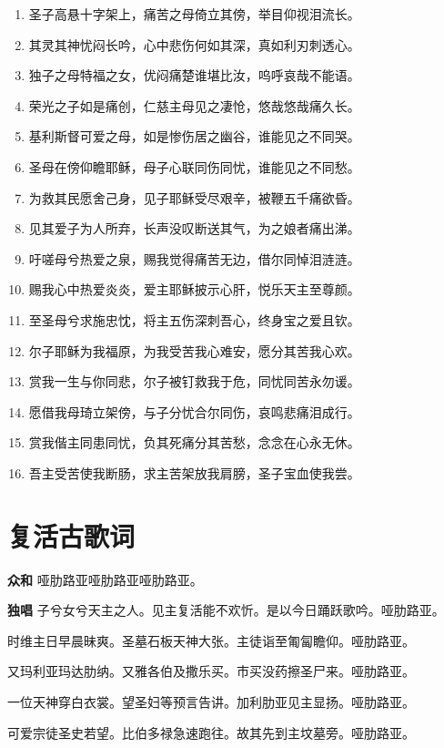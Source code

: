 \documentclass[UTF8,17pt]{ctexart}
\begin{document}
\begin{enumerate}
    \item 圣⼦⾼悬⼗字架上，痛苦之母倚⽴其傍，举⽬仰视泪流长。
    \item 其灵其神忧闷长吟，⼼中悲伤何如其深，真如利刃刺透⼼。
    \item 独⼦之母特福之⼥，优闷痛楚谁堪⽐汝，呜呼哀哉不能语。
    \item 荣光之⼦如是痛创，仁慈主母见之凄怆，悠哉悠哉痛久长。
    \item 基利斯督可爱之母，如是惨伤居之幽⾕，谁能见之不同哭。
    \item 圣母在傍仰瞻耶稣，母⼦⼼联同伤同忧，谁能见之不同愁。
    \item 为救其民愿舍⼰⾝，见⼦耶稣受尽艰⾟，被鞭五千痛欲昏。
    \item 见其爱⼦为⼈所弃，长声没叹断送其⽓，为之娘者痛出涕。
    \item 吁嗟母兮热爱之泉，赐我觉得痛苦⽆边，借尔同悼泪涟涟。
    \item 赐我⼼中热爱炎炎，爱主耶稣披⽰⼼肝，悦乐天主⾄尊颜。
    \item ⾄圣母兮求施忠忱，将主五伤深刺吾⼼，终⾝宝之爱且钦。
    \item 尔⼦耶稣为我福原，为我受苦我⼼难安，愿分其苦我⼼欢。
    \item 赏我⼀⽣与你同悲，尔⼦被钉救我于危，同忧同苦永勿谖。
    \item 愿借我母琦⽴架傍，与⼦分忧合尔同伤，哀鸣悲痛泪成⾏。
    \item 赏我偕主同患同忧，负其死痛分其苦愁，念念在⼼永⽆休。
    \item 吾主受苦使我断肠，求主苦架放我肩膀，圣⼦宝⾎使我尝。
\end{enumerate}

\section{复活古歌词}

\textbf{众和} \quad 哑肋路亚哑肋路亚哑肋路亚。

\textbf{独唱} \quad ⼦兮⼥兮天主之⼈。见主复活能不欢忻。是以今⽇踊跃歌吟。哑肋路亚。

时维主⽇早晨昧爽。圣墓⽯板天神⼤张。主徒诣⾄匍匐瞻仰。哑肋路亚。

又玛利亚玛达肋纳。又雅各伯及撒乐买。市买没药擦圣⼫来。哑肋路亚。

⼀位天神穿⽩⾐裳。望圣妇等预⾔告讲。加利肋亚见主显扬。哑肋路亚。

可爱宗徒圣史若望。⽐伯多禄急速跑往。故其先到主坟墓旁。哑肋路亚。
\end{document}
